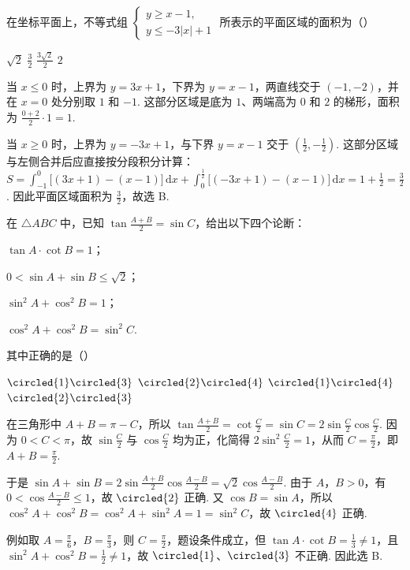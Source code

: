 \begin{problem}
在坐标平面上，不等式组 \(\begin{cases}
y\geqslant x-1,\\
y\leqslant-3|x|+1
\end{cases}\) 所表示的平面区域的面积为（\quad）

\choices
    {\(\sqrt{2}\)}
    {\(\frac{3}{2}\)}
    {\(\frac{3\sqrt{2}}{2}\)}
    {\(2\)}

\begin{solution}
当 \(x\leqslant0\) 时，上界为 \(y=3x+1\)，下界为 \(y=x-1\)，两直线交于 \((-1,-2)\)，并在 \(x=0\) 处分别取 \(1\) 和 \(-1\). 这部分区域是底为 \(1\)、两端高为 \(0\) 和 \(2\) 的梯形，面积为 \(\frac{0+2}{2}\cdot1=1\).

当 \(x\geqslant0\) 时，上界为 \(y=-3x+1\)，与下界 \(y=x-1\) 交于 \((\frac12,-\frac12)\). 这部分区域与左侧合并后应直接按分段积分计算：
\(\displaystyle S=\int_{-1}^{0}\bigl[(3x+1)-(x-1)\bigr]\,\mathrm dx+\int_{0}^{\frac{1}{2}}\bigl[(-3x+1)-(x-1)\bigr]\,\mathrm dx=1+\frac12=\frac32\).
因此平面区域面积为 \(\frac32\)，故选 B.
\end{solution}
\end{problem}

\begin{problem}
在 \(\triangle ABC\) 中，已知 \(\tan \frac{A + B}{2} = \sin C\)，给出以下四个论断：

\begin{circlelist}
\item \(\tan A \cdot \cot B = 1\)；
\item \(0 < \sin A + \sin B \leqslant \sqrt{2}\)；
\item \(\sin^2 A + \cos^2 B = 1\)；
\item \(\cos^2 A + \cos^2 B = \sin^2 C\).
\end{circlelist}

其中正确的是（\quad）

\choices
    {\(\circled{1}\circled{3}\)}
    {\(\circled{2}\circled{4}\)}
    {\(\circled{1}\circled{4}\)}
    {\(\circled{2}\circled{3}\)}

\begin{solution}
在三角形中 \(A+B=\pi-C\)，所以
\(\displaystyle\tan\frac{A+B}{2}=\cot\frac C2=\sin C=2\sin\frac C2\cos\frac C2\). 因为 \(0<C<\pi\)，故 \(\sin\frac C2\) 与 \(\cos\frac C2\) 均为正，化简得 \(2\sin^{2}\frac C2=1\)，从而 \(C=\frac\pi2\)，即 \(A+B=\frac\pi2\).

于是 \(\sin A+\sin B=2\sin\frac{A+B}{2}\cos\frac{A-B}{2}=\sqrt2\cos\frac{A-B}{2}\). 由于 \(A\)，\(B>0\)，有 \(0<\cos\frac{A-B}{2}\leqslant1\)，故 \(\circled{2}\) 正确. 又 \(\cos B=\sin A\)，所以 \(\cos^{2}A+\cos^{2}B=\cos^{2}A+\sin^{2}A=1=\sin^{2}C\)，故 \(\circled{4}\) 正确.

例如取 \(A=\frac\pi6\)，\(B=\frac\pi3\)，则 \(C=\frac\pi2\)，题设条件成立，但 \(\tan A\cdot\cot B=\frac13\ne1\)，且 \(\sin^{2}A+\cos^{2}B=\frac12\ne1\)，故 \(\circled{1}\)、\(\circled{3}\) 不正确. 因此选 B.
\end{solution}
\end{problem}


